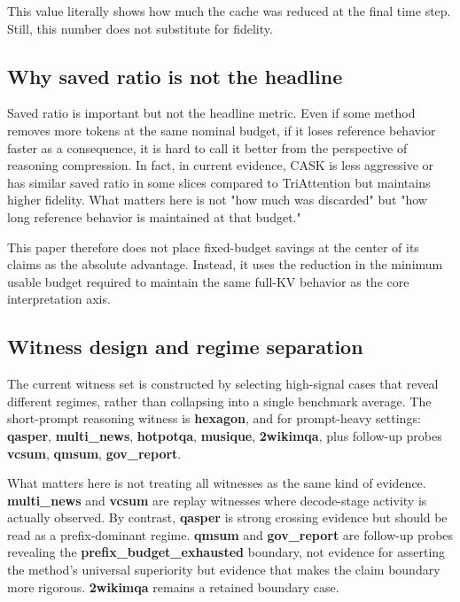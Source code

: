 This value literally shows how much the cache was reduced at the final time step. Still, this number does not substitute for fidelity.


\subsection{Why saved ratio is not the headline}


Saved ratio is important but not the headline metric. Even if some method removes more tokens at the same nominal budget, if it loses reference behavior faster as a consequence, it is hard to call it better from the perspective of reasoning compression. In fact, in current evidence, CASK is less aggressive or has similar saved ratio in some slices compared to TriAttention but maintains higher fidelity. What matters here is not "how much was discarded" but "how long reference behavior is maintained at that budget."


This paper therefore does not place fixed-budget savings at the center of its claims as the absolute advantage. Instead, it uses the reduction in the minimum usable budget required to maintain the same full-KV behavior as the core interpretation axis.


\subsection{Witness design and regime separation}


The current witness set is constructed by selecting high-signal cases that reveal different regimes, rather than collapsing into a single benchmark average. The short-prompt reasoning witness is \textbf{hexagon}, and for prompt-heavy settings: \textbf{qasper}, \textbf{multi\_news}, \textbf{hotpotqa}, \textbf{musique}, \textbf{2wikimqa}, plus follow-up probes \textbf{vcsum}, \textbf{qmsum}, \textbf{gov\_report}.


What matters here is not treating all witnesses as the same kind of evidence. \textbf{multi\_news} and \textbf{vcsum} are replay witnesses where decode-stage activity is actually observed. By contrast, \textbf{qasper} is strong crossing evidence but should be read as a prefix-dominant regime. \textbf{qmsum} and \textbf{gov\_report} are follow-up probes revealing the \textbf{prefix\_budget\_exhausted} boundary, not evidence for asserting the method's universal superiority but evidence that makes the claim boundary more rigorous. \textbf{2wikimqa} remains a retained boundary case.


